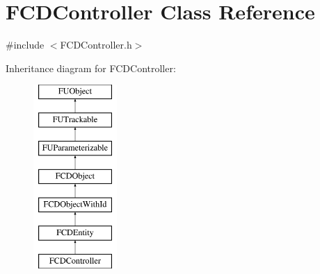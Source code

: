 \hypertarget{classFCDController}{
\section{FCDController Class Reference}
\label{classFCDController}
}


{\ttfamily \#include $<$FCDController.h$>$}

Inheritance diagram for FCDController:\begin{figure}[H]
\begin{center}
\leavevmode
\includegraphics[height=7.000000cm]{classFCDController}
\end{center}
\end{figure}
